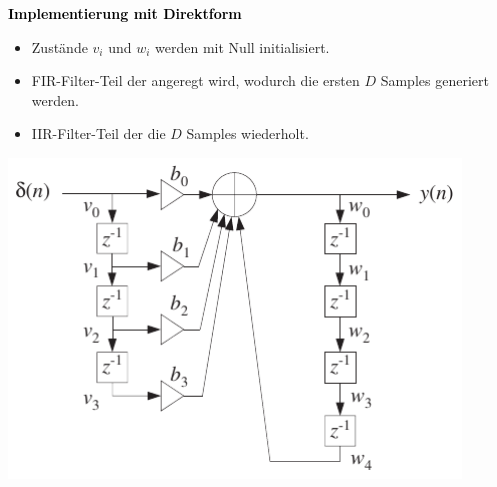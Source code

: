 		\begin{minipage}{0.485\textwidth}
		\textbf{\textcolor{black}{\large{Implementierung mit Direktform}}}\\[-0.2cm]
			\begin{itemize}
			 \item Zustände $v_i$ und $w_i$ werden mit Null initialisiert.\\[-0.4cm]
			 \item FIR-Filter-Teil der angeregt wird, wodurch die ersten $D$ Samples generiert werden.\\[-0.4cm]
			 \item IIR-Filter-Teil der die $D$ Samples wiederholt.\\[-0.2cm]
			\end{itemize}
			\hspace*{0.3cm}\includegraphics[width = 0.9\textwidth]{pic/periodischesWFGenDirektform.pdf}
		\end{minipage}\begin{minipage}{0.03\textwidth}$ $\end{minipage}
